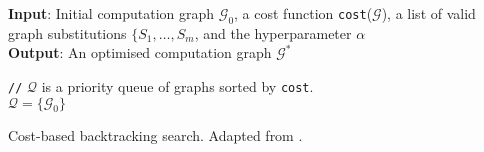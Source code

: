 {\SetAlgoNoLine
\begin{algorithm}[H]
 \textbf{Input}: Initial computation graph $\mathcal{G}_0$, a cost function \texttt{cost}($\mathcal{G}$), a list of valid graph substitutions $\lbrace S_1, \dots, S_m$, and the hyperparameter $\alpha$ \\

 \textbf{Output}: An optimised computation graph $\mathcal{G}^*$

 \texttt{//} $\mathcal{Q}$ is a priority queue of graphs sorted by \texttt{cost}.\\
 $\mathcal{Q} = \lbrace \mathcal{G}_0 \rbrace$


 \caption{Cost-based backtracking search. Adapted from \cite{jia2019taso}.}
 \label{algo:taso}
\end{algorithm}}